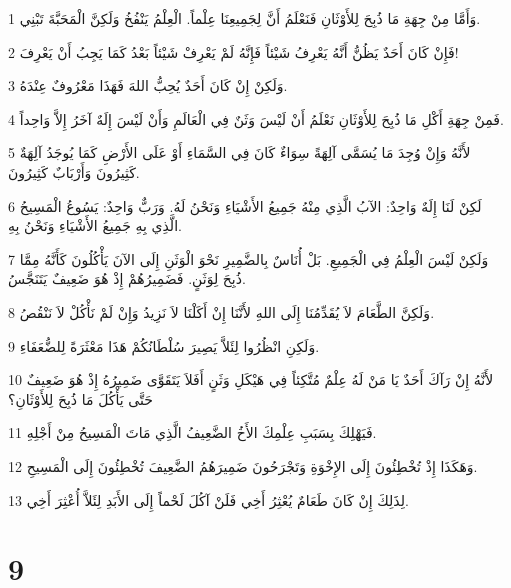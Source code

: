 \par 1 وَأَمَّا مِنْ جِهَةِ مَا ذُبِحَ لِلأَوْثَانِ فَنَعْلَمُ أَنَّ لِجَمِيعِنَا عِلْماً. الْعِلْمُ يَنْفُخُ وَلَكِنَّ الْمَحَبَّةَ تَبْنِي.
\par 2 فَإِنْ كَانَ أَحَدٌ يَظُنُّ أَنَّهُ يَعْرِفُ شَيْئاً فَإِنَّهُ لَمْ يَعْرِفْ شَيْئاً بَعْدُ كَمَا يَجِبُ أَنْ يَعْرِفَ!
\par 3 وَلَكِنْ إِنْ كَانَ أَحَدٌ يُحِبُّ اللهَ فَهَذَا مَعْرُوفٌ عِنْدَهُ.
\par 4 فَمِنْ جِهَةِ أَكْلِ مَا ذُبِحَ لِلأَوْثَانِ نَعْلَمُ أَنْ لَيْسَ وَثَنٌ فِي الْعَالَمِ وَأَنْ لَيْسَ إِلَهٌ آخَرُ إِلاَّ وَاحِداً.
\par 5 لأَنَّهُ وَإِنْ وُجِدَ مَا يُسَمَّى آلِهَةً سِوَاءٌ كَانَ فِي السَّمَاءِ أَوْ عَلَى الأَرْضِ كَمَا يُوجَدُ آلِهَةٌ كَثِيرُونَ وَأَرْبَابٌ كَثِيرُونَ.
\par 6 لَكِنْ لَنَا إِلَهٌ وَاحِدٌ: الآبُ الَّذِي مِنْهُ جَمِيعُ الأَشْيَاءِ وَنَحْنُ لَهُ. وَرَبٌّ وَاحِدٌ: يَسُوعُ الْمَسِيحُ الَّذِي بِهِ جَمِيعُ الأَشْيَاءِ وَنَحْنُ بِهِ.
\par 7 وَلَكِنْ لَيْسَ الْعِلْمُ فِي الْجَمِيعِ. بَلْ أُنَاسٌ بِالضَّمِيرِ نَحْوَ الْوَثَنِ إِلَى الآنَ يَأْكُلُونَ كَأَنَّهُ مِمَّا ذُبِحَ لِوَثَنٍ. فَضَمِيرُهُمْ إِذْ هُوَ ضَعِيفٌ يَتَنَجَّسُ.
\par 8 وَلَكِنَّ الطَّعَامَ لاَ يُقَدِّمُنَا إِلَى اللهِ لأَنَّنَا إِنْ أَكَلْنَا لاَ نَزِيدُ وَإِنْ لَمْ نَأْكُلْ لاَ نَنْقُصُ.
\par 9 وَلَكِنِ انْظُرُوا لِئَلاَّ يَصِيرَ سُلْطَانُكُمْ هَذَا مَعْثَرَةً لِلضُّعَفَاءِ.
\par 10 لأَنَّهُ إِنْ رَآكَ أَحَدٌ يَا مَنْ لَهُ عِلْمٌ مُتَّكِئاً فِي هَيْكَلِ وَثَنٍ أَفَلاَ يَتَقَوَّى ضَمِيرُهُ إِذْ هُوَ ضَعِيفٌ حَتَّى يَأْكُلَ مَا ذُبِحَ لِلأَوْثَانِ؟
\par 11 فَيَهْلِكَ بِسَبَبِ عِلْمِكَ الأَخُ الضَّعِيفُ الَّذِي مَاتَ الْمَسِيحُ مِنْ أَجْلِهِ.
\par 12 وَهَكَذَا إِذْ تُخْطِئُونَ إِلَى الإِخْوَةِ وَتَجْرَحُونَ ضَمِيرَهُمُ الضَّعِيفَ تُخْطِئُونَ إِلَى الْمَسِيحِ.
\par 13 لِذَلِكَ إِنْ كَانَ طَعَامٌ يُعْثِرُ أَخِي فَلَنْ آكُلَ لَحْماً إِلَى الأَبَدِ لِئَلاَّ أُعْثِرَ أَخِي.

\chapter{9}

